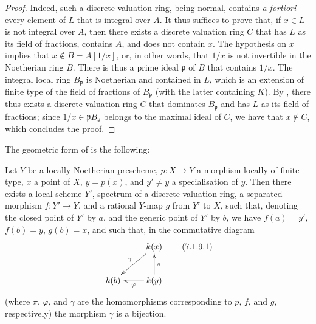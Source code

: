 \begin{proof}
Indeed, such a discrete valuation ring, being normal, contains \emph{a fortiori} every element of $L$ that is integral over $A$.
It thus suffices to prove that, if $x\in L$ is not integral over $A$, then there exists a discrete valuation ring $C$ that has $L$ as its field of fractions, contains $A$, and does not contain $x$.
The hypothesis on $x$ implies that $x\not\in B=A[1/x]$, or, in other words, that $1/x$ is not invertible in the Noetherian ring $B$.
There is thus a prime ideal $\mathfrak{p}$ of $B$ that contains $1/x$.
The integral local ring $B_\mathfrak{p}$ is Noetherian and contained in $L$, which is an extension  of finite type of the field of fractions of $B_\mathfrak{p}$ (with the latter containing $K$).
By , there thus exists a discrete valuation ring $C$ that dominates $B_\mathfrak{p}$ and has $L$ as its field of fractions;
since $1/x\in\mathfrak{p}B_\mathfrak{p}$ belongs to the maximal ideal of $C$, we have that $x\not\in C$, which concludes the proof.
\end{proof}

The geometric form of  is the following:

\begin{proposition}[7.1.9]
\label{II.7.1.9}
Let $Y$ be a locally Noetherian prescheme, $p:X\to Y$ a morphism locally of finite type, $x$ a point of $X$, $y=p(x)$, and $y'\neq y$ a specialisation of $y$.
Then there exists a local scheme $Y'$, spectrum of a discrete valuation ring, a separated morphism $f:Y'\to Y$, and a rational $Y$-map $g$ from $Y'$ to $X$, such that, denoting the closed point of $Y'$ by $a$, and the generic point of $Y'$ by $b$, we have $f(a)=y'$, $f(b)=y$, $g(b)=x$, and such that, in the commutative diagram
\[
\label{II.7.1.9.1}
    \xymatrix{
        & \kres(x) \ar[dl]_{\gamma}
    \\  \kres(b)
        & \kres(y) \ar[u]_{\pi} \ar[l]^{\varphi}
    }
\tag{7.1.9.1}
\]
(where $\pi$, $\varphi$, and $\gamma$ are the homomorphisms corresponding to $p$, $f$, and $g$, respectively) the morphism $\gamma$ is a bijection.
\end{proposition}

